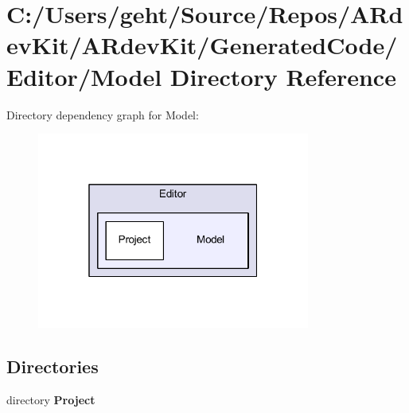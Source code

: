 \section{C\-:/\-Users/geht/\-Source/\-Repos/\-A\-Rdev\-Kit/\-A\-Rdev\-Kit/\-Generated\-Code/\-Editor/\-Model Directory Reference}
\label{dir_2e8998034d032ce944334ec7985e2221}
Directory dependency graph for Model\-:
\nopagebreak
\begin{figure}[H]
\begin{center}
\leavevmode
\includegraphics[width=254pt]{dir_2e8998034d032ce944334ec7985e2221_dep}
\end{center}
\end{figure}
\subsection*{Directories}
\begin{DoxyCompactItemize}
\item 
directory {\bf Project}
\end{DoxyCompactItemize}
